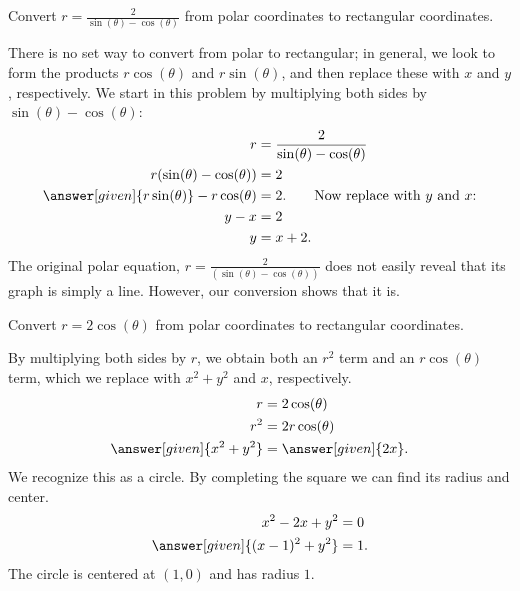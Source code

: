 \documentclass{ximera}
\begin{document}
\begin{example}
   Convert $r=\frac{2}{\sin(\theta)-\cos(\theta)}$ from polar coordinates
   to rectangular coordinates.
   \begin{explanation}
     There is no set way to convert from polar to rectangular; in
     general, we look to form the products $r\cos(\theta)$ and
     $r\sin(\theta)$, and then replace these with $x$ and $y$,
     respectively. We start in this problem by multiplying both sides
     by $\sin(\theta)-\cos(\theta)$:
     \begin{align*}
       r &= \frac{2}{\sin(\theta)-\cos(\theta)} \\
       r(\sin(\theta)-\cos(\theta)) &= 2\\
       \answer[given]{r\sin(\theta)}-r\cos(\theta) &= 2. \qquad \text{Now replace with $y$ and $x$:}\\
       y-x &= 2\\
	  y &= x+2.
     \end{align*}
     The original polar equation, $r=\frac{2}{(\sin(\theta)-\cos(\theta))}$ does
     not easily reveal that its graph is simply a line. However, our
     conversion shows that it is.
   \end{explanation}
\end{example}

\begin{example}
   Convert $r =2\cos(\theta)$ from polar coordinates to rectangular
   coordinates.        	
   \begin{explanation}
     By multiplying both sides by $r$, we obtain both an $r^2$ term
     and an $r\cos(\theta)$ term, which we replace with $x^2+y^2$ and
     $x$, respectively.
     \begin{align*}
       r &=2\cos(\theta) \\
       r^2 &= 2r\cos(\theta) \\
       \answer[given]{x^2+y^2} &= \answer[given]{2x}. 
     \end{align*}
     We recognize this as a circle. By completing the square we can
     find its radius and center.
     \begin{align*}
       x^2-2x+y^2 &= 0 \\
       \answer[given]{(x-1)^2 + y^2} &=1.
     \end{align*}
     The circle is centered at $(1,0)$ and has radius $1$.
   \end{explanation}
 \end{example}
\end{document}

